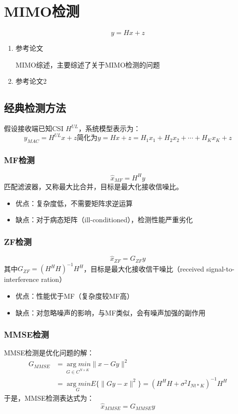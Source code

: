 \section{MIMO检测}
$$
y=Hx+z
$$

\begin{enumerate}
    \item  参考论文\cite{2019Massive} \par
        MIMO综述，主要综述了关于MIMO检测的问题
    \item 参考论文2
\end{enumerate}
\subsection{经典检测方法}
假设接收端已知CSI $H^{UL}$，系统模型表示为：
\begin{equation}
y_{MAC}=H^{UL}x+z 简化为 y=Hx+z=H_1x_1+H_2x_2+\cdots+H_Kx_K+z
\end{equation}
\subsubsection{MF检测}
\begin{equation}
\hat{x}_{MF}=H^Hy
\end{equation}
匹配滤波器，又称最大比合并，目标是最大化接收信噪比。
\begin{itemize}
    \item 优点：复杂度低，不需要矩阵求逆运算
    \item 缺点：对于病态矩阵（ill-conditioned），检测性能严重劣化
\end{itemize}
    
\subsubsection{ZF检测}
\begin{equation}
    \hat{x}_{ZF}=G_{ZF}y
\end{equation}
其中$G_{ZF}=(H^HH)^{-1}H^H$，目标是最大化接收信干噪比（received signal-to-interference ration）
\begin{itemize}
    \item 优点：性能优于MF（复杂度较MF高）
    \item 缺点：对忽略噪声的影响，与MF类似，会有噪声加强的副作用
\end{itemize}
\subsubsection{MMSE检测}
MMSE检测是优化问题的解：
\begin{equation}
\begin{aligned}
    G_{MMSE}&=\underset{G\in C^{N \times K}}{\arg min}\|x-Gy\|^2 \\
    &= \underset{G}{\arg min}E\{\|Gy-x\|^2\}=(H^HH+\sigma^2I_{Nt*K})^{-1}H^H
\end{aligned}
\end{equation}
于是，MMSE检测表达式为：
\begin{equation}
    \hat{x}_{MMSE}=G_{MMSE}y
\end{equation} \\

